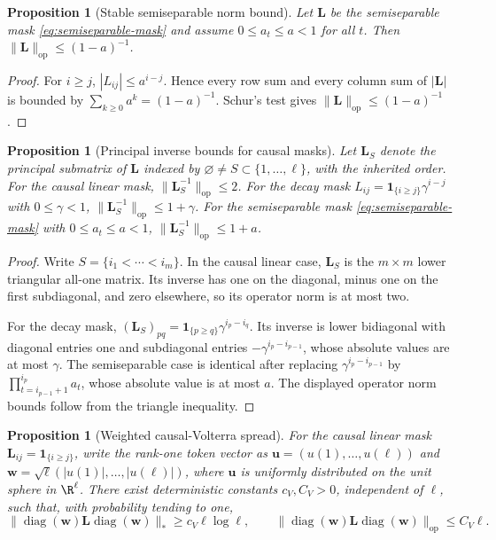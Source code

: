 \documentclass{article}
\newcommand{\diag}{\operatorname{diag}}
\newcommand{\op}{\operatorname{op}}
\newcommand{\one}{\mathbf{1}}
\newcommand{\bL}{\mathbf{L}}
\newcommand{\bu}{\mathbf{u}}
\newcommand{\bw}{\mathbf{w}}
\newtheorem{proposition}[theorem]{Proposition}
\theoremstyle{definition}
\theoremstyle{remark}
\begin{document}
\begin{proposition}[Stable semiseparable norm bound]
Let $\bL$ be the semiseparable mask \eqref{eq:semiseparable-mask} and assume
$0\leq a_t\leq a<1$ for all $t$.  Then
$\|\bL\|_{\op}\leq(1-a)^{-1}$.
\label{prop:semiseparable-bound}
\end{proposition}

\begin{proof}
For $i\geq j$, $|L_{ij}|\leq a^{i-j}$.  Hence every row sum and every column sum
of $|\bL|$ is bounded by $\sum_{k\geq0}a^k=(1-a)^{-1}$.  Schur's test gives
$\|\bL\|_{\op}\leq(1-a)^{-1}$.
\end{proof}

\begin{proposition}[Principal inverse bounds for causal masks]
Let $\bL_S$ denote the principal submatrix of $\bL$ indexed by
$\varnothing\neq S\subset\{1,\ldots,\ell\}$, with the inherited order.  For
the causal linear mask, $\|\bL_S^{-1}\|_{\op}\leq2$.  For the decay mask
$L_{ij}=\one_{\{i\geq j\}}\gamma^{i-j}$ with $0\leq\gamma<1$,
$\|\bL_S^{-1}\|_{\op}\leq1+\gamma$.  For the semiseparable mask
\eqref{eq:semiseparable-mask} with $0\leq a_t\leq a<1$,
$\|\bL_S^{-1}\|_{\op}\leq1+a$.
\label{prop:principal-inverse-bound}
\end{proposition}

\begin{proof}
Write $S=\{i_1<\cdots<i_m\}$.  In the causal linear case, $\bL_S$ is the
$m\times m$ lower triangular all-one matrix.  Its inverse has one on the
diagonal, minus one on the first subdiagonal, and zero elsewhere, so its
operator norm is at most two.

For the decay mask, $(\bL_S)_{pq}=\one_{\{p\geq q\}}\gamma^{i_p-i_q}$.  Its
inverse is lower bidiagonal with diagonal entries one and subdiagonal entries
$-\gamma^{i_p-i_{p-1}}$, whose absolute values are at most $\gamma$.  The
semiseparable case is identical after replacing
$\gamma^{i_p-i_{p-1}}$ by $\prod_{t=i_{p-1}+1}^{i_p}a_t$, whose absolute value
is at most $a$.  The displayed operator norm bounds follow from the triangle
inequality.
\end{proof}

\begin{proposition}[Weighted causal-Volterra spread]
For the causal linear mask $\bL_{ij}=\one_{\{i\geq j\}}$, write the rank-one
token vector as $\bu=(u(1),\ldots,u(\ell))$ and
$\bw=\sqrt\ell(|u(1)|,\ldots,|u(\ell)|)$, where $\bu$ is uniformly
distributed on the unit sphere in $\R^\ell$.  There exist deterministic
constants $c_V,C_V>0$, independent of $\ell$, such that, with probability
tending to one,
\begin{equation}
    \|\diag(\bw)\bL\diag(\bw)\|_*
    \geq c_V\ell\log\ell,
    \qquad
    \|\diag(\bw)\bL\diag(\bw)\|_{\op}
    \leq C_V\ell.
    \label{eq:weighted-volterra-spread}
\end{equation}
\label{prop:weighted-volterra-spread}
\end{proposition}
\end{document}
